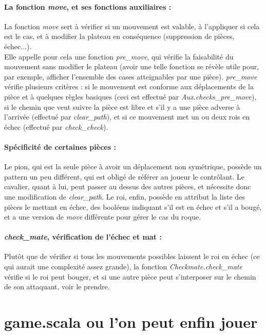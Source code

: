 \documentclass[a4paper]{article}
\begin{document}
\paragraph{La fonction \textit{move}, et ses fonctions auxiliaires :} La fonction \textit{move} sert à vérifier si un mouvement est valable, à l'appliquer si cela est le cas, et à modifier la plateau en conséquence (suppression de pièces, échec...). \\
Elle appelle pour cela une fonction \textit{pre\_move}, qui vérifie la faisabilité du mouvement sans modifier le plateau (avoir une telle fonction se révèle utile pour, par exemple, afficher l'ensemble des cases atteignables par une pièce).
\textit{pre\_move} vérifie plusieurs critères : si le mouvement est conforme aux déplacements de la pièce et à quelques règles basiques (ceci est effectué par \textit{Aux.checks\_pre\_move}), si le chemin que veut suivre la pièce est libre et s'il y a une pièce adverse à l'arrivée (effectué par \textit{clear\_path}), et si ce mouvement met un ou deux rois en échec (effectué par \textit{check\_check}).

\paragraph{Spécificité de certaines pièces :} Le pion, qui est la seule pièce à avoir un déplacement non symétrique, possède un pattern un peu différent, qui est obligé de référer au joueur le contrôlant.
Le cavalier, quant à lui, peut passer au dessus des autres pièces, et nécessite donc une modification de \textit{clear\_path}.
Le roi, enfin, possède en attribut la liste des pièces le mettant en échec, des booléens indiquant s'il est en échec et s'il a bougé, et a une version de \textit{move} différente pour gérer le cas du roque. 

\paragraph{\textit{check\_mate}, vérification de l'échec et mat :} Plutôt que de vérifier si tous les mouvements possibles laissent le roi en échec (ce qui aurait une complexité assez grande), la fonction \textit{Checkmate.check\_mate} vérifie si le roi peut bouger, et si une autre pièce peut s'interposer sur le chemin de son attaquant, voir le prendre.

\section{game.scala ou l'on peut enfin jouer}
\end{document}
